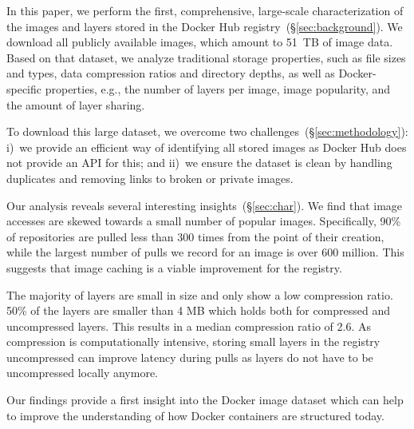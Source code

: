 In this paper, we perform the first, comprehensive, large-scale characterization
of the images and layers stored in the Docker Hub
registry~(\S\ref{sec:background}).
%
We download all publicly available images, which amount to 51~TB of
image data. Based on that dataset, we analyze traditional storage properties, such
as file sizes and types, data compression ratios and directory depths, as well as
Docker-specific properties, e.g., the number of layers per image, image popularity,
and the amount of layer sharing.


To download this large dataset, we overcome two
challenges~(\S\ref{sec:methodology}): i)~we provide an efficient way of identifying
all stored images as Docker Hub does not provide an API for this;
and ii)~we ensure the dataset is clean by handling
duplicates and removing links to broken or private images.

Our analysis reveals several interesting insights~(\S\ref{sec:char}). 
We find that image
accesses are skewed towards a small number of popular images. Specifically,
90\% of repositories are pulled less than 300 times from the point of their
creation, while the largest number of pulls we record for an image is
over 600 million. This suggests that image caching is a viable improvement
for the registry.

The majority of layers are small in size and only show a low compression ratio.
50\% of the layers are smaller than 4 MB which holds both for compressed and 
uncompressed layers. This results in a median compression ratio of 2.6.
As compression is computationally intensive, storing small layers in the
registry uncompressed can improve latency during pulls as layers do not
have to be uncompressed locally anymore.

Our findings provide a first insight into the Docker image dataset which
can help to improve the understanding of how Docker containers are structured
today.



